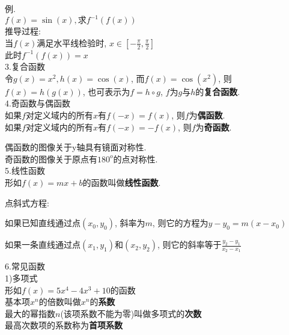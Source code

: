 例.\\
\phantom{例}$f(x)=\sin(x), \text{求}f^{-1}(f(x))$\\
推导过程:\\
当$f(x)$满足水平线检验时, $x\in[-\frac{\pi}{2},\frac{\pi}{2}]$\\
此时$f^{-1}(f(x))=x$\\[2ex]

3.复合函数\\
令$g(x)=x^2, h(x)=\cos(x)$, 而$f(x)=\cos(x^2)$, 则$f(x)=h(g(x))$, 也可表示为$f=h\circ g$, $f$为$g$与$h$的\textbf{复合函数}.\\[2ex]

4.奇函数与偶函数\\
如果$f$对定义域内的所有$x$有$f(-x)=f(x)$, 则$f$为\textbf{偶函数}.\\
如果$f$对定义域内的所有$x$有$f(-x)=-f(x)$, 则$f$为\textbf{奇函数}.

偶函数的图像关于y轴具有镜面对称性.\\
奇函数的图像关于原点有$180^o$的点对称性.\\[2ex]

5.线性函数\\
形如$f(x)=mx+b$的函数叫做\textbf{线性函数}.

点斜式方程:
\begin{center}
\begin{boxedminipage}{\textwidth}
	如果已知直线通过点$(x_0,y_0)$, 斜率为$m$, 则它的方程为$y-y_0=m(x-x_0)$
\end{boxedminipage}
\end{center}\vspace{4ex}

\begin{center}
\begin{boxedminipage}{11cm}
	如果一条直线通过点$(x_1,y_1)$和$(x_2,y_2)$, 则它的斜率等于$\displaystyle\frac{y_2-y_1}{x_2-x_1}$
\end{boxedminipage}
\end{center}\vspace{8ex}

6.常见函数\\
1)多项式\\
形如$f(x)=5x^4-4x^3+10$的函数\\[1ex]
基本项$x^n$的倍数叫做$x^n$的\textbf{系数}\\[1ex]
最大的幂指数$n$(该项系数不能为零)叫做多项式的\textbf{次数}\\[1ex]
最高次数项的系数称为\textbf{首项系数}\\

